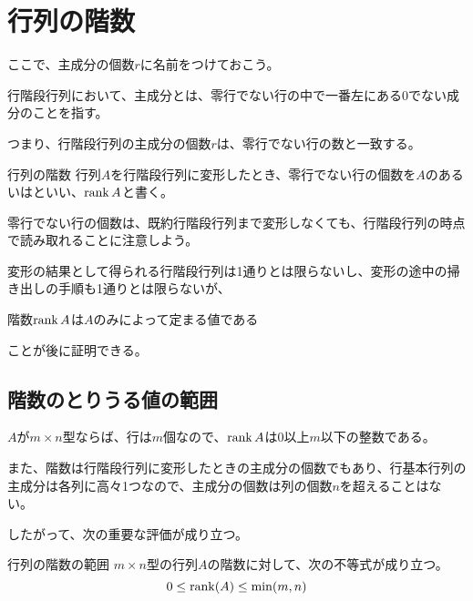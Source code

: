 \documentclass[../../../topic_linear-algebra]{subfiles}
\begin{document}
\sectionline
\section{行列の階数}

ここで、主成分の個数$r$に名前をつけておこう。

\br

行階段行列において、主成分とは、零行でない行の中で一番左にある0でない成分のことを指す。

つまり、行階段行列の主成分の個数$r$は、零行でない行の数と一致する。

\begin{definition}{行列の階数}
  行列$A$を行階段行列に変形したとき、零行でない行の個数を$A$のあるいはといい、$\rank A$と書く。
\end{definition}

零行でない行の個数は、既約行階段行列まで変形しなくても、行階段行列の時点で読み取れることに注意しよう。

\br

変形の結果として得られる行階段行列は1通りとは限らないし、変形の途中の掃き出しの手順も1通りとは限らないが、
\begin{emphabox}
  \begin{spacebox}
    \begin{center}
      階数$\rank A$は$A$のみによって定まる値である
    \end{center}
  \end{spacebox}
\end{emphabox}
ことが後に証明できる。

\subsection{階数のとりうる値の範囲}

$A$が$m \times n$型ならば、行は$m$個なので、$\rank A$は0以上$m$以下の整数である。

\br

また、階数は行階段行列に変形したときの主成分の個数でもあり、行基本行列の主成分は各列に高々1つなので、主成分の個数は列の個数$n$を超えることはない。

\br

したがって、次の重要な評価が成り立つ。

\begin{theorem}{行列の階数の範囲}\label{thm:rank-bounds}
  $m \times n$型の行列$A$の階数に対して、次の不等式が成り立つ。
  \begin{equation*}
    0 \leq \rank(A) \leq \min(m,n)
  \end{equation*}
\end{theorem}
\end{document}
